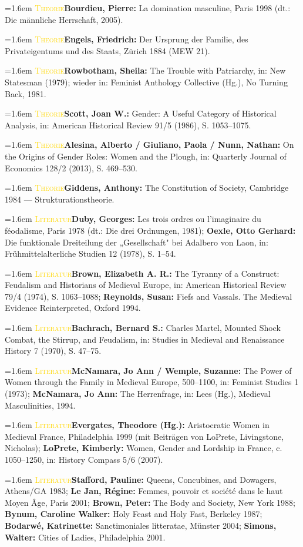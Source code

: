 \documentclass[11pt,a4paper,ngerman]{scrartcl}
\newcommand{\litentry}[2]{\par\noindent\hangindent=1.6em\hangafter=1
  {\footnotesize\scshape\textcolor{gold}{#1}}\quad #2\par\smallskip}
\begin{document}
\litentry{Theorie}{\textbf{Bourdieu, Pierre:} La domination masculine, Paris 1998 (dt.: Die männliche Herrschaft, 2005).}
\litentry{Theorie}{\textbf{Engels, Friedrich:} Der Ursprung der Familie, des Privateigentums und des Staats, Zürich 1884 (MEW 21).}
\litentry{Theorie}{\textbf{Rowbotham, Sheila:} The Trouble with Patriarchy, in: New Statesman (1979); wieder in: Feminist Anthology Collective (Hg.), No Turning Back, 1981.}
\litentry{Theorie}{\textbf{Scott, Joan W.:} Gender: A Useful Category of Historical Analysis, in: American Historical Review 91/5 (1986), S. 1053–1075.}
\litentry{Theorie}{\textbf{Alesina, Alberto / Giuliano, Paola / Nunn, Nathan:} On the Origins of Gender Roles: Women and the Plough, in: Quarterly Journal of Economics 128/2 (2013), S. 469–530.}
\litentry{Theorie}{\textbf{Giddens, Anthony:} The Constitution of Society, Cambridge 1984 — Strukturationstheorie.}
\litentry{Literatur}{\textbf{Duby, Georges:} Les trois ordres ou l'imaginaire du féodalisme, Paris 1978 (dt.: Die drei Ordnungen, 1981); \textbf{Oexle, Otto Gerhard:} Die funktionale Dreiteilung der „Gesellschaft" bei Adalbero von Laon, in: Frühmittelalterliche Studien 12 (1978), S. 1–54.}
\litentry{Literatur}{\textbf{Brown, Elizabeth A. R.:} The Tyranny of a Construct: Feudalism and Historians of Medieval Europe, in: American Historical Review 79/4 (1974), S. 1063–1088; \textbf{Reynolds, Susan:} Fiefs and Vassals. The Medieval Evidence Reinterpreted, Oxford 1994.}
\litentry{Literatur}{\textbf{Bachrach, Bernard S.:} Charles Martel, Mounted Shock Combat, the Stirrup, and Feudalism, in: Studies in Medieval and Renaissance History 7 (1970), S. 47–75.}
\litentry{Literatur}{\textbf{McNamara, Jo Ann / Wemple, Suzanne:} The Power of Women through the Family in Medieval Europe, 500–1100, in: Feminist Studies 1 (1973); \textbf{McNamara, Jo Ann:} The Herrenfrage, in: Lees (Hg.), Medieval Masculinities, 1994.}
\litentry{Literatur}{\textbf{Evergates, Theodore (Hg.):} Aristocratic Women in Medieval France, Philadelphia 1999 (mit Beiträgen von LoPrete, Livingstone, Nicholas); \textbf{LoPrete, Kimberly:} Women, Gender and Lordship in France, c. 1050–1250, in: History Compass 5/6 (2007).}
\litentry{Literatur}{\textbf{Stafford, Pauline:} Queens, Concubines, and Dowagers, Athens/GA 1983; \textbf{Le Jan, Régine:} Femmes, pouvoir et société dans le haut Moyen Âge, Paris 2001; \textbf{Brown, Peter:} The Body and Society, New York 1988; \textbf{Bynum, Caroline Walker:} Holy Feast and Holy Fast, Berkeley 1987; \textbf{Bodarwé, Katrinette:} Sanctimoniales litteratae, Münster 2004; \textbf{Simons, Walter:} Cities of Ladies, Philadelphia 2001.}
\end{document}
